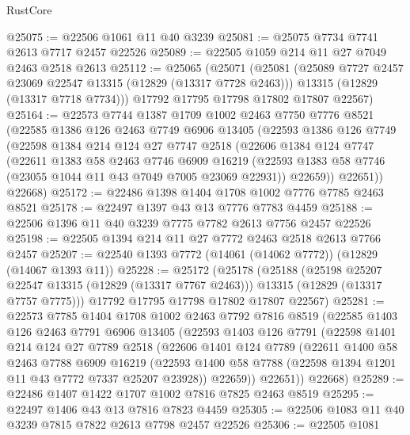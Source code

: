 \begin{lexlean}{RustCore}
\begin{coremodule}
@25075 := @22506 @1061 @11 @40 @3239
@25081 := @25075 @7734 @7741 @2613 @7717 @2457 @22526
@25089 := @22505 @1059 @214 @11 @27 @7049 @2463 @2518 @2613
@25112 := @25065
    (@25071
      (@25081
        (@25089 @7727 @2457 @23069 @22547 @13315 (@12829 (@13317 @7728 @2463)))
        @13315
        (@12829 (@13317 @7718 @7734)))
      @17792
      @17795
      @17798
      @17802
      @17807
      @22567)
@25164 := @22573
    @7744
    @1387
    @1709
    @1002
    @2463
    @7750
    @7776
    @8521
    (@22585
      @1386
      @126
      @2463
      @7749
      @6906
      @13405
      (@22593
        @1386
        @126
        @7749
        (@22598
          @1384
          @214
          @124
          @27
          @7747
          @2518
          (@22606
            @1384
            @124
            @7747
            (@22611
              @1383
              @58
              @2463
              @7746
              @6909
              @16219
              (@22593 @1383 @58 @7746 (@23055 @1044 @11 @43 @7049 @7005 @23069 @22931))
              @22659))
          @22651))
      @22668)
@25172 := @22486 @1398 @1404 @1708 @1002 @7776 @7785 @2463 @8521
@25178 := @22497 @1397 @43 @13 @7776 @7783 @4459
@25188 := @22506 @1396 @11 @40 @3239 @7775 @7782 @2613 @7756 @2457 @22526
@25198 := @22505 @1394 @214 @11 @27 @7772 @2463 @2518 @2613 @7766 @2457
@25207 := @22540 @1393 @7772 (@14061 (@14062 @7772)) (@12829 (@14067 @1393 @11))
@25228 := @25172
    (@25178
      (@25188
        (@25198 @25207 @22547 @13315 (@12829 (@13317 @7767 @2463)))
        @13315
        (@12829 (@13317 @7757 @7775)))
      @17792
      @17795
      @17798
      @17802
      @17807
      @22567)
@25281 := @22573
    @7785
    @1404
    @1708
    @1002
    @2463
    @7792
    @7816
    @8519
    (@22585
      @1403
      @126
      @2463
      @7791
      @6906
      @13405
      (@22593
        @1403
        @126
        @7791
        (@22598
          @1401
          @214
          @124
          @27
          @7789
          @2518
          (@22606
            @1401
            @124
            @7789
            (@22611
              @1400
              @58
              @2463
              @7788
              @6909
              @16219
              (@22593 @1400 @58 @7788 (@22598 @1394 @1201 @11 @43 @7772 @7337 @25207 @23928))
              @22659))
          @22651))
      @22668)
@25289 := @22486 @1407 @1422 @1707 @1002 @7816 @7825 @2463 @8519
@25295 := @22497 @1406 @43 @13 @7816 @7823 @4459
@25305 := @22506 @1083 @11 @40 @3239 @7815 @7822 @2613 @7798 @2457 @22526
@25306 := @22505 @1081

\end{coremodule}
\end{lexlean}
